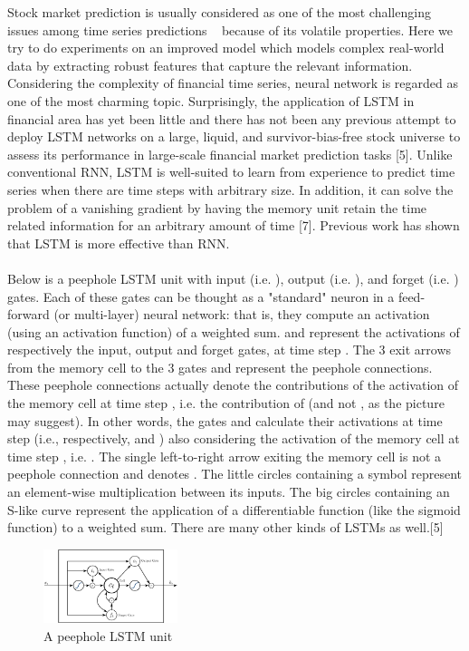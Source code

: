 \usepackage{fancyhdr}\documentclass[conference]{IEEEtran}
\begin{document}
Stock market prediction is usually considered as one of the most challenging issues among time series predictions ~\cite{13} because of its volatile properties. Here we try to do experiments on an improved model which models complex real-world data by extracting robust features that capture the relevant information. Considering the complexity of financial time series, neural network is regarded as one of the most charming topic. Surprisingly, the application of LSTM in financial area has yet been little and there has not been any previous attempt to deploy LSTM networks on a large, liquid, and survivor-bias-free stock universe to assess its performance in large-scale financial market prediction tasks [5]. Unlike conventional RNN, LSTM is well-suited to learn from experience to predict time series when there are time steps with arbitrary size.  In addition, it can solve the problem of a vanishing gradient by having the memory unit retain the time related information for an arbitrary amount of time  [7]. Previous work has shown that LSTM is more effective than RNN.  
\\ 
\\
Below is a peephole LSTM unit with input (i.e. ), output (i.e. ), and forget (i.e. ) gates. Each of these gates can be thought as a "standard" neuron in a feed-forward (or multi-layer) neural network: that is, they compute an activation (using an activation function) of a weighted sum. and represent the activations of respectively the input, output and forget gates, at time step . The 3 exit arrows from the memory cell to the 3 gates and represent the peephole connections. These peephole connections actually denote the contributions of the activation of the memory cell at time step , i.e. the contribution of (and not , as the picture may suggest). In other words, the gates and calculate their activations at time step (i.e., respectively, and ) also considering the activation of the memory cell at time step , i.e. . The single left-to-right arrow exiting the memory cell is not a peephole connection and denotes . The little circles containing a symbol represent an element-wise multiplication between its inputs. The big circles containing an S-like curve represent the application of a differentiable function (like the sigmoid function) to a weighted sum. There are many other kinds of LSTMs as well.[5]

\begin{figure}[htpb]
\begin{center}
\includegraphics[width=0.35\textwidth]{LSTM_source/LSTM_2.png}
\vspace{-0.2cm}
\caption{A peephole LSTM unit \cite{14}}
\label{fig_bar}
\end{center}
\vspace{-0.4cm}
\end{figure}
\end{document}
